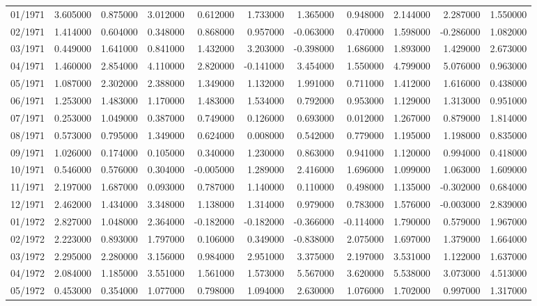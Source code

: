 \begin{tabular}{lrrrrrrrrrr}
01/1971 & 3.605000 & 0.875000 & 3.012000 & 0.612000 & 1.733000 & 1.365000 & 0.948000 & 2.144000 & 2.287000 & 1.550000 \\
02/1971 & 1.414000 & 0.604000 & 0.348000 & 0.868000 & 0.957000 & -0.063000 & 0.470000 & 1.598000 & -0.286000 & 1.082000 \\
03/1971 & 0.449000 & 1.641000 & 0.841000 & 1.432000 & 3.203000 & -0.398000 & 1.686000 & 1.893000 & 1.429000 & 2.673000 \\
04/1971 & 1.460000 & 2.854000 & 4.110000 & 2.820000 & -0.141000 & 3.454000 & 1.550000 & 4.799000 & 5.076000 & 0.963000 \\
05/1971 & 1.087000 & 2.302000 & 2.388000 & 1.349000 & 1.132000 & 1.991000 & 0.711000 & 1.412000 & 1.616000 & 0.438000 \\
06/1971 & 1.253000 & 1.483000 & 1.170000 & 1.483000 & 1.534000 & 0.792000 & 0.953000 & 1.129000 & 1.313000 & 0.951000 \\
07/1971 & 0.253000 & 1.049000 & 0.387000 & 0.749000 & 0.126000 & 0.693000 & 0.012000 & 1.267000 & 0.879000 & 1.814000 \\
08/1971 & 0.573000 & 0.795000 & 1.349000 & 0.624000 & 0.008000 & 0.542000 & 0.779000 & 1.195000 & 1.198000 & 0.835000 \\
09/1971 & 1.026000 & 0.174000 & 0.105000 & 0.340000 & 1.230000 & 0.863000 & 0.941000 & 1.120000 & 0.994000 & 0.418000 \\
10/1971 & 0.546000 & 0.576000 & 0.304000 & -0.005000 & 1.289000 & 2.416000 & 1.696000 & 1.099000 & 1.063000 & 1.609000 \\
11/1971 & 2.197000 & 1.687000 & 0.093000 & 0.787000 & 1.140000 & 0.110000 & 0.498000 & 1.135000 & -0.302000 & 0.684000 \\
12/1971 & 2.462000 & 1.434000 & 3.348000 & 1.138000 & 1.314000 & 0.979000 & 0.783000 & 1.576000 & -0.003000 & 2.839000 \\
01/1972 & 2.827000 & 1.048000 & 2.364000 & -0.182000 & -0.182000 & -0.366000 & -0.114000 & 1.790000 & 0.579000 & 1.967000 \\
02/1972 & 2.223000 & 0.893000 & 1.797000 & 0.106000 & 0.349000 & -0.838000 & 2.075000 & 1.697000 & 1.379000 & 1.664000 \\
03/1972 & 2.295000 & 2.280000 & 3.156000 & 0.984000 & 2.951000 & 3.375000 & 2.197000 & 3.531000 & 1.122000 & 1.637000 \\
04/1972 & 2.084000 & 1.185000 & 3.551000 & 1.561000 & 1.573000 & 5.567000 & 3.620000 & 5.538000 & 3.073000 & 4.513000 \\
05/1972 & 0.453000 & 0.354000 & 1.077000 & 0.798000 & 1.094000 & 2.630000 & 1.076000 & 1.702000 & 0.997000 & 1.317000 \\

\end{tabular}

